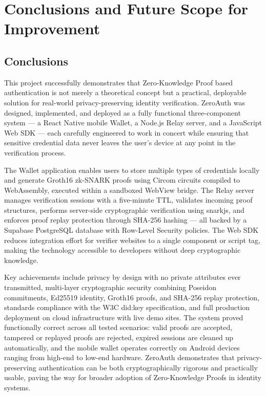 \chapter{Conclusions and Future Scope for Improvement}

\section{Conclusions}

This project successfully demonstrates that Zero-Knowledge Proof based authentication is not merely a theoretical concept but a practical, deployable solution for real-world privacy-preserving identity verification. ZeroAuth was designed, implemented, and deployed as a fully functional three-component system --- a React Native mobile Wallet, a Node.js Relay server, and a JavaScript Web SDK --- each carefully engineered to work in concert while ensuring that sensitive credential data never leaves the user's device at any point in the verification process.

The Wallet application enables users to store multiple types of credentials locally and generate Groth16 zk-SNARK proofs using Circom circuits compiled to WebAssembly, executed within a sandboxed WebView bridge. The Relay server manages verification sessions with a five-minute TTL, validates incoming proof structures, performs server-side cryptographic verification using snarkjs, and enforces proof replay protection through SHA-256 hashing --- all backed by a Supabase PostgreSQL database with Row-Level Security policies. The Web SDK reduces integration effort for verifier websites to a single component or script tag, making the technology accessible to developers without deep cryptographic knowledge.

Key achievements include privacy by design with no private attributes ever transmitted, multi-layer cryptographic security combining Poseidon commitments, Ed25519 identity, Groth16 proofs, and SHA-256 replay protection, standards compliance with the W3C did:key specification, and full production deployment on cloud infrastructure with live demo sites. The system proved functionally correct across all tested scenarios: valid proofs are accepted, tampered or replayed proofs are rejected, expired sessions are cleaned up automatically, and the mobile wallet operates correctly on Android devices ranging from high-end to low-end hardware. ZeroAuth demonstrates that privacy-preserving authentication can be both cryptographically rigorous and practically usable, paving the way for broader adoption of Zero-Knowledge Proofs in identity systems.

